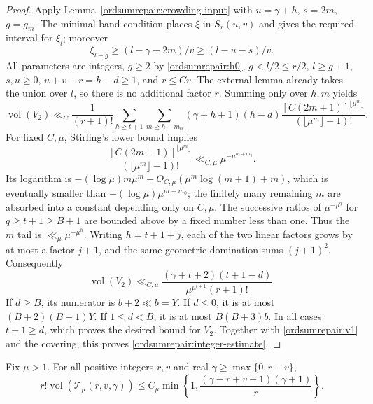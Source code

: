 \begin{proof}
Apply Lemma~\ref{ordsumrepair:crowding-input} with
$u=\gamma+h$, $s=2m$, $g=g_m$. The minimal-band condition places
$\xi$ in $S_r(u,v)$ and gives the required interval for $\xi_l$;
moreover
\[
 \xi_{l-g}\geq(l-\gamma-2m)/v\geq(l-u-s)/v.
\]
All parameters are integers, $g\geq2$ by
\eqref{ordsumrepair:h0}, $g<l/2\leq r/2$, $l\geq g+1$,
$s,u\geq0$, $u+v-r=h-d\geq1$, and $r\leq Cv$.
The external lemma already takes the union over $l$, so there is no
additional factor $r$. Summing only over $h,m$ yields
\begin{equation}
 \operatorname{vol}(V_2)\ll_C\frac1{(r+1)!}
 \sum_{h\geq t+1}\sum_{m\geq h-m_0}
 (\gamma+h+1)(h-d)
 \frac{[C(2m+1)]^{\lfloor\mu^m\rfloor}}
      {(\lfloor\mu^m\rfloor-1)!}.
 \label{ordsumrepair:v2sum}
\end{equation}
For fixed $C,\mu$, Stirling's lower bound implies
\[
 \frac{[C(2m+1)]^{\lfloor\mu^m\rfloor}}
      {(\lfloor\mu^m\rfloor-1)!}
 \ll_{C,\mu}\mu^{-\mu^{m+m_0}}.
\]
Its logarithm is
$-(\log\mu)m\mu^m+O_{C,\mu}(\mu^m\log(m+1)+m)$, which is eventually
smaller than $-(\log\mu)\mu^{m+m_0}$; the finitely many remaining
$m$ are absorbed into a constant depending only on $C,\mu$.
The successive ratios of $\mu^{-\mu^q}$ for $q\geq t+1\geq B+1$
are bounded above by a fixed number less than one. Thus the $m$ tail
is $\ll_\mu\mu^{-\mu^h}$. Writing $h=t+1+j$, each of the two
linear factors grows by at most a factor $j+1$, and the same
geometric domination sums $(j+1)^2$. Consequently
\begin{equation}
 \operatorname{vol}(V_2)\ll_{C,\mu}
 \frac{(\gamma+t+2)(t+1-d)}{\mu^{\mu^{t+1}}(r+1)!}.
 \label{ordsumrepair:v2}
\end{equation}
If $d\geq B$, its numerator is $b+2\ll b=Y$.
If $d\leq0$, it is at most $(B+2)(B+1)Y$.
If $1\leq d<B$, it is at most $B(B+3)b$.
In all cases $t+1\geq d$, which proves the desired bound for $V_2$.
Together with \eqref{ordsumrepair:v1} and the covering, this proves
\eqref{ordsumrepair:integer-estimate}.
\end{proof}

\begin{corollary}[The $A=0$ estimate for every count]
\label{ordsumrepair:a0}
Fix $\mu>1$. For all positive integers $r,v$ and real
$\gamma\geq\max\{0,r-v\}$,
\begin{equation}
 r!\operatorname{vol}(\mathcal T_\mu(r,v,\gamma))
 \leq C_\mu\min\left\{1,
      \frac{(\gamma-r+v+1)(\gamma+1)}r\right\}.
 \label{ordsumrepair:a0-bound}
\end{equation}
\end{corollary}

